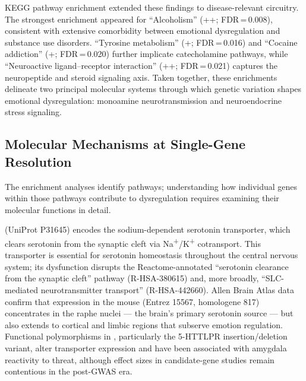 KEGG pathway enrichment extended these findings to disease-relevant circuitry.
The strongest enrichment appeared for ``Alcoholism''
(++; FDR\,=\,0.008), consistent with
extensive comorbidity between emotional dysregulation and substance use
disorders.
``Tyrosine metabolism'' (+; FDR\,=\,0.016) and
``Cocaine addiction'' (+; FDR\,=\,0.020) further
implicate catecholamine pathways, while ``Neuroactive ligand--receptor
interaction'' (++; FDR\,=\,0.021) captures
the neuropeptide and steroid signaling axis.
Taken together, these enrichments delineate two principal molecular systems
through which genetic variation shapes emotional dysregulation: monoamine
neurotransmission and neuroendocrine stress signaling.

\subsection*{Molecular Mechanisms at Single-Gene Resolution}

The enrichment analyses identify pathways; understanding how individual genes
within those pathways contribute to dysregulation requires examining their
molecular functions in detail.

 (UniProt P31645) encodes the sodium-dependent serotonin
transporter, which clears serotonin from the synaptic cleft via Na\textsuperscript{+}/K\textsuperscript{+}
cotransport.
This transporter is essential for serotonin homeostasis throughout the central
nervous system; its dysfunction disrupts the Reactome-annotated ``serotonin
clearance from the synaptic cleft'' pathway (R-HSA-380615) and, more broadly,
``SLC-mediated neurotransmitter transport'' (R-HSA-442660).
Allen Brain Atlas data confirm that  expression in the mouse
(Entrez 15567, homologene 817) concentrates in the raphe nuclei — the brain's
primary serotonin source — but also extends to cortical and limbic
regions that subserve emotion regulation.
Functional polymorphisms in , particularly the 5-HTTLPR
insertion/deletion variant, alter transporter expression and have been
associated with amygdala reactivity to threat, although effect sizes in
candidate-gene studies remain contentious in the post-GWAS era.

